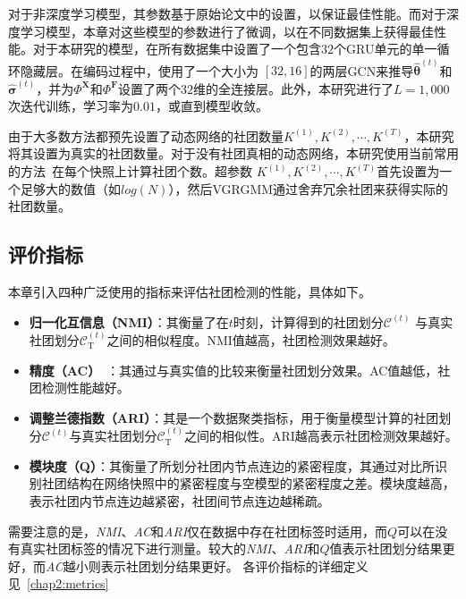 对于非深度学习模型，其参数基于原始论文中的设置，以保证最佳性能。而对于深度学习模型，本章对这些模型的参数进行了微调，以在不同数据集上获得最佳性能。对于本研究的模型，在所有数据集中设置了一个包含$32$个GRU单元的单一循环隐藏层。在编码过程中，使用了一个大小为 $[32,16]$的两层GCN来推导$\hat{\bm{\theta}}^{(t)}$和$\hat{\bm{\sigma}}^{(t)}$，并为$\Phi^{\mathbf{X}}$和$\Phi^{\mathbf{F}}$设置了两个$32$维的全连接层。此外，本研究进行了$L=1,000$次迭代训练，学习率为$0.01$，或直到模型收敛。

由于大多数方法都预先设置了动态网络的社团数量$K^{(1)}, K^{(2)}, \cdots, K^{(T)}$，本研究将其设置为真实的社团数量。对于没有社团真相的动态网络，本研究使用当前常用的方法~\cite{Krzakala.2013.Zhang}在每个快照上计算社团个数。超参数 $K^{(1)},K^{(2)},\cdots,K^{(T)}$首先设置为一个足够大的数值（如$log(N)$），然后VGRGMM通过舍弃冗余社团来获得实际的社团数量。


\subsection{评价指标}
本章引入四种广泛使用的指标来评估社团检测的性能，具体如下。
\begin{itemize}
  \item \textbf{归一化互信息（NMI）}：其衡量了在$t$时刻，计算得到的社团划分$\mathcal{C}^{(t)}$ 与真实社团划分$\mathcal{C}_{\mathrm{T}}^{(t)}$之间的相似程度。NMI值越高，社团检测效果越好。
\item \textbf{精度（AC）}~\cite{folino2013evolutionary}：其通过与真实值的比较来衡量社团划分效果。AC值越低，社团检测性能越好。

\item \textbf{调整兰德指数（ARI）}：其是一个数据聚类指标，用于衡量模型计算的社团划分$\mathcal{C}^{(t)}$与真实社团划分$\mathcal{C}_{\mathrm{T}}^{(t)}$之间的相似性。ARI越高表示社团检测效果越好。

\item \textbf{模块度（Q）}：其衡量了所划分社团内节点连边的紧密程度，其通过对比所识别社团结构在网络快照中的紧密程度与空模型的紧密程度之差。模块度越高，表示社团内节点连边越紧密，社团间节点连边越稀疏。
\end{itemize}
需要注意的是，\emph{NMI}、\emph{AC}和\emph{ARI}仅在数据中存在社团标签时适用，而$Q$可以在没有真实社团标签的情况下进行测量。较大的\emph{NMI}、\emph{ARI}和$Q$值表示社团划分结果更好，而\emph{AC}越小则表示社团划分结果更好。
各评价指标的详细定义见~\ref{chap2:metrics}




